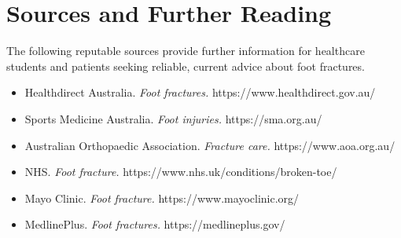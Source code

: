\section*{Sources and Further Reading}
The following reputable sources provide further information for healthcare students and patients seeking reliable, current advice about foot fractures.
\begin{itemize}
    \item Healthdirect Australia. \textit{Foot fractures.} https://www.healthdirect.gov.au/
    \item Sports Medicine Australia. \textit{Foot injuries.} https://sma.org.au/
    \item Australian Orthopaedic Association. \textit{Fracture care.} https://www.aoa.org.au/
    \item NHS. \textit{Foot fracture.} https://www.nhs.uk/conditions/broken-toe/
    \item Mayo Clinic. \textit{Foot fracture.} https://www.mayoclinic.org/
    \item MedlinePlus. \textit{Foot fractures.} https://medlineplus.gov/
\end{itemize}
